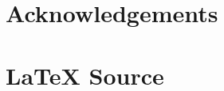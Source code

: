 \documentclass{article}
\theoremstyle{definition}
\begin{document}
\section{Acknowledgements}
%
%
\section*{\LaTeX \hspace{0.10 mm} Source}
%
%
%


%
%
\end{document}
